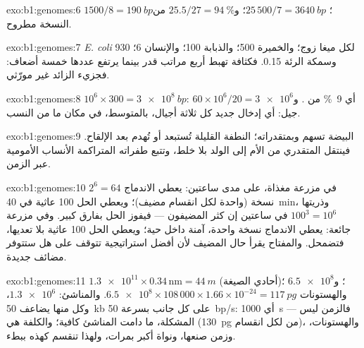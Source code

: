 \begin{solution}{exo:b1:genomes:6}
 $1500/8 = \qty{190}{bp}$؛ 
$25\,500/7 = \qty{3640}{bp}$؛ و$25.5/27 = \qty{94}{\%}$ من النسخة
مطروح.
\end{solution}

\begin{solution}{exo:b1:genomes:7}
\emph{E. coli} 930  لكل ميغا زوج؛ والخميرة 500؛ والذبابة 100؛
والإنسان 6؛ وسمكة الرئة 0.15. فكثافة  تهبط أربع مراتب قدر
بينما يرتفع عددها خمسة أضعاف: فجزيء  الزائد غير مورّثي.
\end{solution}

\begin{solution}{exo:b1:genomes:8}
$10^6\times 300 = \qty{3e8}{bp}$: أي \qty{9}{\%} من .
و$60\times
10^6/20 = \num{3e6}$ جيل: أي إدخال جديد كل ثلاثة أجيال،
بالمتوسط، في مكان ما من النسب.
\end{solution}

\begin{solution}{exo:b1:genomes:9}
البيضة تسهم  وبمتقدراته؛  النطفة القليلة تُستبعد
أو تُهدم بعد الإلقاح. فينتقل  المتقدري من الأم إلى الولد بلا خلط،
وتتبع طفراته المتراكمة الأنساب الأمومية عبر الزمن.
\end{solution}

\begin{solution}{exo:b1:genomes:10}
في مزرعة مغذاة، على مدى ساعتين: يعطي الاندماج $2^6 = 64$ نسخة (واحدة
لكل انقسام مضيف)؛ ويعطي الحل 100 عاثية في \qty{40}{min}، وذريتها
$100^3 = 10^6$ في ساعتين إن كثر المضيفون --- فيفوز الحل بفارق كبير.
وفي مزرعة جائعة: يعطي الاندماج نسخة واحدة، آمنة داخل  حية؛ ويعطي
الحل 100 عاثية بلا  تعديها، فتضمحل. والمفتاح يقرأ حال المضيف لأن
أفضل استراتيجية تتوقف على هل ستتوفر مضائف جديدة.
\end{solution}

\begin{solution}{exo:b1:genomes:11}
$\num{1.3e11}\times 0.34\,\mathrm{nm} = \qty{44}{m}$ (أحادي الصيغة)؛
و$\num{6.5e8}$ ؛ والهستونات $\num{6.5e8}\times 108\,000\times
1.66\times 10^{-24} = \qty{117}{pg}$. والمناشئ: $\num{1.3e6}$، وكل
منها يضاعف \qty{50}{kb} على كل جانب بسرعة \qty{50}{bp/s}: أي \qty{1000}{s}
--- فالزمن ليس المشكلة، ما دامت المناشئ كافية؛ والكلفة هي
 (\qty{130}{pg} من  لكل انقسام)، والهستونات، وزمن
صنعها، ونواة  أكبر بمرات، ولهذا تنقسم  كهذه ببطء.
\end{solution}

